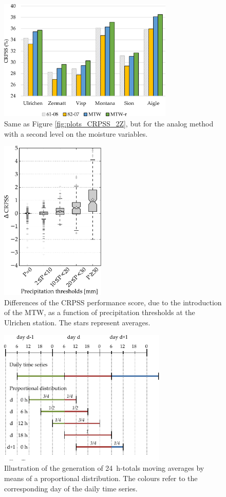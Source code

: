 \documentclass[hess, manuscript]{copernicus}
\begin{document}
\begin{figure}[htb]
	\includegraphics[width=8.3cm]{figures/plots_CRPSS_2Z-2MI.pdf}
	\caption{Same as Figure \ref{fig:plots_CRPSS_2Z}, but for the analog method with a second level on the moisture variables.}
	\label{fig:plots_CRPSS_2Z-2MI}
\end{figure}

\begin{figure}[htb]
	\includegraphics[width=5cm]{figures/changes_CRPS_precip_threshold.pdf}
	\caption{Differences of the CRPSS performance score, due to the introduction of the MTW, as a function of precipitation thresholds at the Ulrichen station. The stars represent averages.}
	\label{fig:changes_CRPS_precip_threshold}
\end{figure}

\begin{figure}[htb]
	\begin{center}
		\includegraphics[width=8cm]{figures/illustration_disaggregation.pdf}
	\end{center}
	\caption{Illustration of the generation of 24~h-totals moving averages by means of a proportional distribution. The colours refer to the corresponding day of the daily time series.}
	\label{fig:illustration_disaggregation}
\end{figure}
\end{document}
